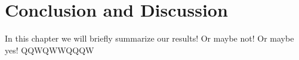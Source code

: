 \chapter{Conclusion and Discussion}

In this chapter we will briefly summarize our results! Or maybe not! Or maybe yes!
QQWQWWQQQW
\label{conclusion_chapter}

